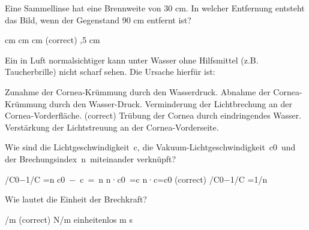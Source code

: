 \documentclass[11pt]{exam}
\begin{document}
\setlength{\voffset}{-0.5in}
\setlength{\headsep}{5pt}

\hspace{2mm}
 \hspace{5mm}
\vspace{4mm}

\begin{questions}

\question Eine Sammellinse hat eine Brennweite von 30 cm. In welcher Entfernung entsteht das Bild, wenn der Gegenstand 90 cm entfernt ist?

\begin{choices}
	 cm
	 cm
	 cm
	\choice 45cm (correct)
	,5 cm
\end{choices}

\vspace{3mm}\question Ein in Luft normalsichtiger kann unter Wasser ohne Hilfsmittel (z.B. Taucherbrille) nicht scharf sehen. Die Ursache hierfür ist:

\begin{choices}
	\choice Zunahme der Cornea-Krümmung durch den Wasserdruck.
	\choice Abnahme der Cornea-Krümmung durch den Wasser-Druck.
	\choice Verminderung der Lichtbrechung an der Cornea-Vorderfläche. (correct)
	\choice Trübung der Cornea durch eindringendes Wasser.
	\choice Verstärkung der Lichtstreuung an der Cornea-Vorderseite.
\end{choices}

\vspace{3mm}\question Wie sind die Lichtgeschwindigkeit c, die Vakuum-Lichtgeschwindigkeit c0 und der Brechungsindex n miteinander verknüpft?

\begin{choices}
	 /C0−1/C =n
	\choice c0 − c = n
	\choice n·c0 =c
	\choice n·c=c0 (correct)
	 /C0−1/C =1/n
\end{choices}

\vspace{3mm}\question Wie lautet die Einheit der Brechkraft?

\begin{choices}
	/m (correct)
	\choice N/m
	\choice einheitenlos
	\choice m
	\choice s
\end{choices}


\end{questions}
\end{document}
